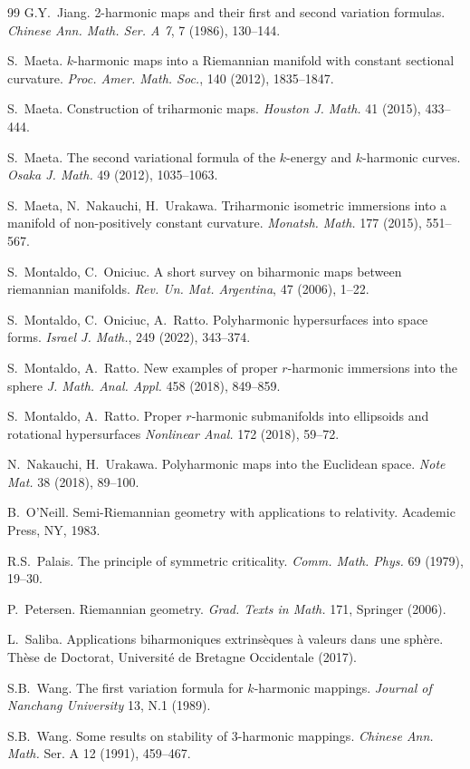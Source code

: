 \documentclass[11pt]{amsart}
\theoremstyle{plain}
\theoremstyle{definition}
\numberwithin{equation}{section}
\numberwithin{equation}{section}
\begin{document}
\begin{thebibliography}{99}
 G.Y.~Jiang. {2-harmonic maps and their first and second variation formulas}.
{\it Chinese Ann. Math. Ser. A 7},  7 (1986), 130--144.

 S.~Maeta. {$k$-harmonic maps into a Riemannian manifold with constant sectional curvature}.
{\it Proc. Amer. Math. Soc.},  140 (2012), 1835--1847.

 S.~Maeta. {Construction of triharmonic maps}.
{\it Houston J. Math.} 41 (2015), 433--444. 

 S.~Maeta. {The second variational formula of the $k$-energy and $k$-harmonic curves}. {\it Osaka J. Math.} 49 (2012), 1035--1063.

 S.~Maeta, N.~Nakauchi, H.~Urakawa. {Triharmonic isometric immersions into a manifold of non-positively constant curvature}. {\it Monatsh. Math.} 177 (2015), 551--567. 

 S.~Montaldo, C.~Oniciuc. {A short survey on biharmonic maps between riemannian manifolds}. {\it Rev. Un. Mat. Argentina}, 47 (2006), 1--22.

 S.~Montaldo, C.~Oniciuc, A.~Ratto. {Polyharmonic hypersurfaces into space forms}. {\it Israel J. Math.}, 249 (2022), 343--374.
 
 S.~Montaldo, A.~Ratto. {New examples of proper $r$-harmonic immersions into the sphere} {\em J. Math. Anal. Appl.} 458 (2018), 849--859.

 S.~Montaldo, A.~Ratto. {Proper $r$-harmonic submanifolds into ellipsoids and rotational hypersurfaces} {\em Nonlinear Anal.} 172 (2018), 59--72.

 N.~Nakauchi, H.~Urakawa. Polyharmonic maps into the Euclidean space. {\em Note Mat.} 38 (2018), 89--100. 

 B.~O'Neill. {Semi-Riemannian geometry with applications to relativity}. Academic Press, NY, 1983.

 R.S.~Palais. {The principle of symmetric criticality}. {\it Comm. Math. Phys.} 69 (1979), 19--30.

 P.~Petersen. Riemannian geometry. {\em Grad. Texts in Math.} 171, Springer (2006).

 L.~Saliba. Applications biharmoniques extrins\`{e}ques \`{a} valeurs dans une sph\`{e}re. Th\`{e}se de Doctorat, Universit\'e de Bretagne Occidentale (2017).

 S.B.~Wang. {The first variation formula for $k$-harmonic mappings}.
{\it Journal of Nanchang University} 13, N.1 (1989). 

 S.B.~Wang. Some results on stability of 3-harmonic mappings. {\it Chinese Ann. Math.} Ser. A 12 (1991), 459--467.

\end{thebibliography}
\newpage
\end{document}
